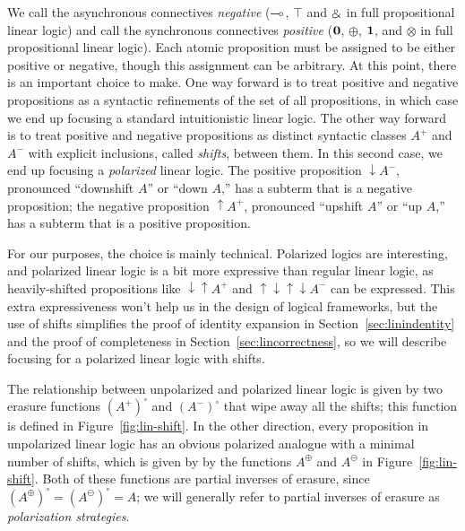 We call the asynchronous connectives {\it negative} ($\multimap$, $\top$
and $\mathbin{\binampersand}$ in full propositional linear logic) and call the
synchronous connectives {\it positive} ($\mathbf{0}$, $\oplus$, $\mathbf{1}$, and
$\otimes$ in full propositional linear logic). Each atomic proposition
must be assigned to be either positive or negative, though this
assignment can be arbitrary. At this point, there is an important
choice to make. One way forward is to treat positive and negative
propositions as a syntactic refinements of the set of all
propositions, in which case we end up focusing a standard
intuitionistic linear logic. The other way forward is to treat
positive and negative propositions as distinct syntactic classes $A^+$
and $A^-$ with explicit inclusions, called {\it shifts}, between
them. In this second case, we end up focusing a {\it polarized} linear
logic.  The positive proposition ${\downarrow}A^-$, pronounced
``downshift $A$'' or ``down $A$,'' has a subterm that is a negative
proposition; the negative proposition ${\uparrow}A^+$, pronounced
``upshift $A$'' or ``up $A$,'' has a subterm that is a positive
proposition.

For our purposes, the choice is mainly technical.  Polarized logics
are interesting, and polarized linear logic is a bit more expressive
than regular linear logic, as heavily-shifted propositions like
${\downarrow}{\uparrow}A^+$ and
${\uparrow}{\downarrow}{\uparrow}{\downarrow}A^-$ can be
expressed. This extra expressiveness won't help us in the design of
logical frameworks, but the use of shifts simplifies the proof of
identity expansion in Section~\ref{sec:linindentity} and the proof of
completeness in Section~\ref{sec:lincorrectness}, so we will describe
focusing for a polarized linear logic with shifts.



The relationship between unpolarized and polarized linear logic is
given by two erasure functions $(A^+)^\circ$ and $(A^-)^\circ$ that
wipe away all the shifts; this function is defined in
Figure~\ref{fig:lin-shift}. In the other direction, every 
proposition in unpolarized linear logic has an obvious polarized
analogue with a minimal number of shifts, which is given by by
the functions $A^\oplus$ and $A^\ominus$ in Figure~\ref{fig:lin-shift}.
Both of these functions are partial inverses of erasure, since
$(A^\oplus)^\circ = (A^\ominus)^\circ = A$; we will generally refer
to partial inverses of erasure as {\it polarization strategies}. 

